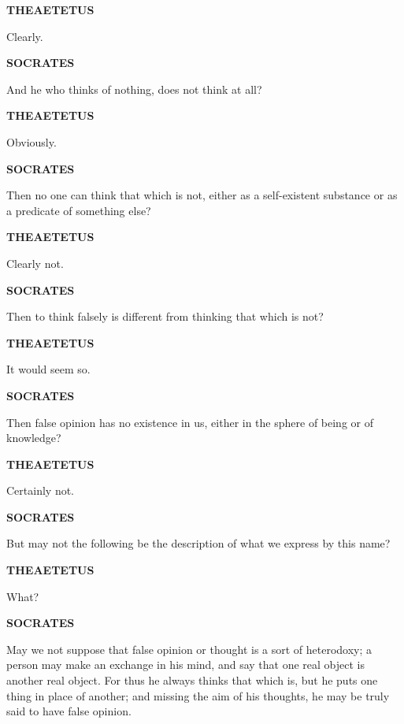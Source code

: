 \documentclass[11pt,letter]{article}
\begin{document}
\par \textbf{THEAETETUS}
\par   Clearly.

\par \textbf{SOCRATES}
\par   And he who thinks of nothing, does not think at all?

\par \textbf{THEAETETUS}
\par   Obviously.

\par \textbf{SOCRATES}
\par   Then no one can think that which is not, either as a self-existent substance or as a predicate of something else?

\par \textbf{THEAETETUS}
\par   Clearly not.

\par \textbf{SOCRATES}
\par   Then to think falsely is different from thinking that which is not?

\par \textbf{THEAETETUS}
\par   It would seem so.

\par \textbf{SOCRATES}
\par   Then false opinion has no existence in us, either in the sphere of being or of knowledge?

\par \textbf{THEAETETUS}
\par   Certainly not.

\par \textbf{SOCRATES}
\par   But may not the following be the description of what we express by this name?

\par \textbf{THEAETETUS}
\par   What?

\par \textbf{SOCRATES}
\par   May we not suppose that false opinion or thought is a sort of heterodoxy; a person may make an exchange in his mind, and say that one real object is another real object. For thus he always thinks that which is, but he puts one thing in place of another; and missing the aim of his thoughts, he may be truly said to have false opinion.
\end{document}
